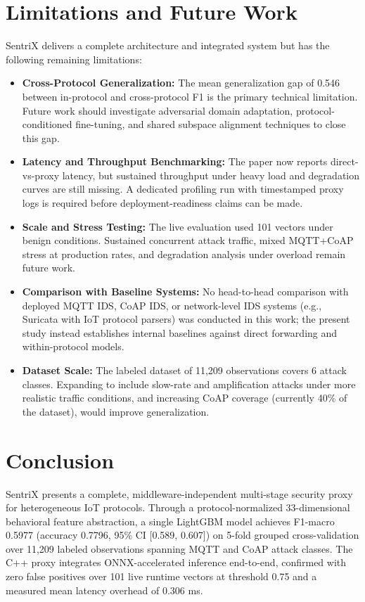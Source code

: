 \documentclass[conference]{IEEEtran}
\begin{document}
\section{Limitations and Future Work}
SentriX delivers a complete architecture and integrated system but has the following remaining limitations:
\begin{itemize}
\item \textbf{Cross-Protocol Generalization:} The mean generalization gap of 0.546 between in-protocol and cross-protocol F1 is the primary technical limitation. Future work should investigate adversarial domain adaptation, protocol-conditioned fine-tuning, and shared subspace alignment techniques to close this gap.
\item \textbf{Latency and Throughput Benchmarking:} The paper now reports direct-vs-proxy latency, but sustained throughput under heavy load and degradation curves are still missing. A dedicated profiling run with timestamped proxy logs is required before deployment-readiness claims can be made.
\item \textbf{Scale and Stress Testing:} The live evaluation used 101 vectors under benign conditions. Sustained concurrent attack traffic, mixed MQTT+CoAP stress at production rates, and degradation analysis under overload remain future work.
\item \textbf{Comparison with Baseline Systems:} No head-to-head comparison with deployed MQTT IDS, CoAP IDS, or network-level IDS systems (e.g., Suricata with IoT protocol parsers) was conducted in this work; the present study instead establishes internal baselines against direct forwarding and within-protocol models.
\item \textbf{Dataset Scale:} The labeled dataset of 11,209 observations covers 6 attack classes. Expanding to include slow-rate and amplification attacks under more realistic traffic conditions, and increasing CoAP coverage (currently 40\% of the dataset), would improve generalization.
\end{itemize}

\section{Conclusion}
SentriX presents a complete, middleware-independent multi-stage security proxy for heterogeneous IoT protocols. Through a protocol-normalized 33-dimensional behavioral feature abstraction, a single LightGBM model achieves F1-macro 0.5977 (accuracy 0.7796, 95\% CI [0.589, 0.607]) on 5-fold grouped cross-validation over 11,209 labeled observations spanning MQTT and CoAP attack classes. The C++ proxy integrates ONNX-accelerated inference end-to-end, confirmed with zero false positives over 101 live runtime vectors at threshold 0.75 and a measured mean latency overhead of 0.306 ms.
\end{document}
